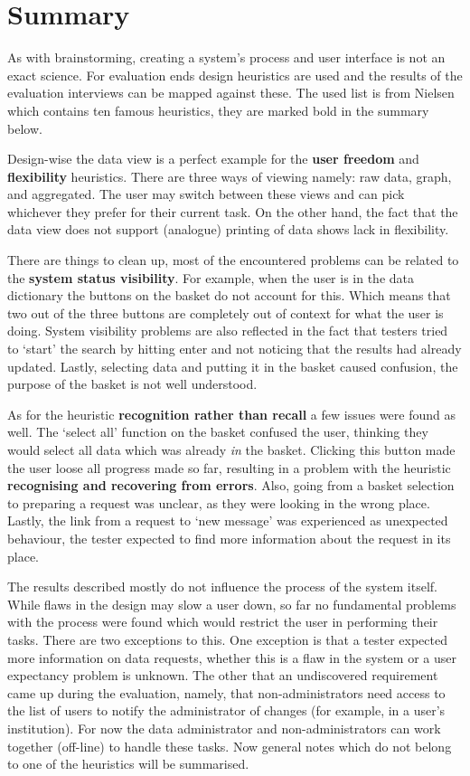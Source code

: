 \section{Summary}
\label{evaluation-summary}

As with brainstorming, creating a system's process and user interface is not an exact science.
For evaluation ends design heuristics are used and the results of the evaluation interviews can be mapped against these.
The used list is from Nielsen \cite{designHeuristics} which contains ten famous heuristics, they are marked bold in the summary below.

Design-wise the data view is a perfect example for the \textbf{user freedom} and \textbf{flexibility} heuristics.
There are three ways of viewing namely: raw data, graph, and aggregated.
The user may switch between these views and can pick whichever they prefer for their current task.
On the other hand, the fact that the data view does not support (analogue) printing of data shows lack in flexibility.

There are things to clean up, most of the encountered problems can be related to the \textbf{system status visibility}.
For example, when the user is in the data dictionary the buttons on the basket do not account for this.
Which means that two out of the three buttons are completely out of context for what the user is doing.
System visibility problems are also reflected in the fact that testers tried to `start' the search by hitting enter and not noticing that the results had already updated.
Lastly, selecting data and putting it in the basket caused confusion, \ie{} the purpose of the basket is not well understood.

As for the heuristic \textbf{recognition rather than recall} a few issues were found as well.
The `select all' function on the basket confused the user, thinking they would select all data which was already \emph{in} the basket.
Clicking this button made the user loose all progress made so far, resulting in a problem with the heuristic \textbf{recognising and recovering from errors}.
Also, going from a basket selection to preparing a request was unclear, as they were looking in the wrong place.
Lastly, the link from a request to `new message' was experienced as unexpected behaviour, the tester expected to find more information about the request in its place.

The results described mostly do not influence the process of the system itself.
While flaws in the design may slow a user down, so far no fundamental problems with the process were found which would restrict the user in performing their tasks.
There are two exceptions to this.
One exception is that a tester expected more information on data requests, whether this is a flaw in the system or a user expectancy problem is unknown.
The other that an undiscovered requirement came up during the evaluation, namely, that non-administrators need access to the list of users to notify the administrator of changes (for example, in a user's institution).
For now the data administrator and non-administrators can work together (off-line) to handle these tasks.
Now general notes which do not belong to one of the heuristics will be summarised.

